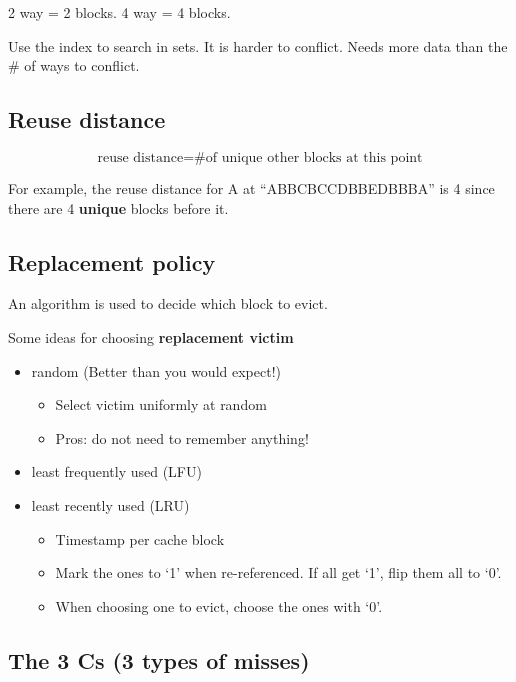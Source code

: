 \documentclass[letterpaper,12pt]{article}
\begin{document}
2 way = 2 blocks. 4 way = 4 blocks.

Use the index to search in sets. It is harder to conflict. Needs more data than the \# of ways to conflict.


\subsection{Reuse distance}

\[
    \text{reuse distance} = \text{\# of unique other blocks at this point}
\]

For example, the reuse distance for A at ``ABBCBCCDBBEDBBBA'' is 4 since there are 4 \textbf{unique} blocks before it.

\subsection{Replacement policy}

An algorithm is used to decide which block to evict.

Some ideas for choosing \textbf{replacement victim}
\begin{itemize}
    \item random (Better than you would expect!)
          \begin{itemize}
              \item Select victim uniformly at random
              \item Pros: do not need to remember anything!
          \end{itemize}
    \item least frequently used (LFU)
    \item least recently used (LRU)
          \begin{itemize}
              \item Timestamp per cache block
              \item Mark the ones to `1' when re-referenced. If all get `1', flip them all to `0'.
              \item When choosing one to evict, choose the ones with `0'.
          \end{itemize}
\end{itemize}

\subsection{The 3 Cs (3 types of misses)}
\end{document}
